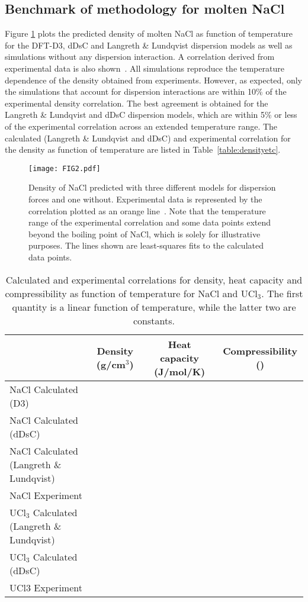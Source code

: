 \documentclass[preprint,3p,10pt,twocolumn,number,sort&compress]{elsarticle}
\begin{document}
\subsection{Benchmark of methodology for molten NaCl}
Figure \ref{fig:NaCldensity} plots the predicted density of molten NaCl as function of temperature for the DFT-D3, dDsC and Langreth \& Lundqvist dispersion models as well as simulations without any dispersion interaction. A correlation derived from experimental data is also shown~\cite{}. All simulations reproduce the temperature dependence of the density obtained from experiments. However, as expected, only the simulations that account for dispersion interactions are within 10\% of the experimental density correlation. The best agreement is obtained for the Langreth \& Lundqvist and dDsC dispersion models, which are within 5\% or less of the experimental correlation across an extended temperature range. The calculated (Langreth \& Lundqvist  and dDsC) and experimental correlation for the density as function of temperature are listed in Table~\ref{table:densityetc}.

\begin{figure}[htb]
\centering
\texttt{[image: FIG2.pdf]}
\caption{Density of NaCl predicted with three different models for dispersion forces and one without. Experimental data is represented by the correlation plotted as an orange line~\cite{}. Note that the temperature range of the experimental correlation and some data points extend beyond the boiling point of NaCl, which is solely for illustrative purposes. The lines shown are least-squares fits to the calculated data points.} 
\label{fig:NaCldensity}
\end{figure}

\begin{table*}[hb!]
\centering
\begin{tabular}{lccc}
\hline
\hline
& Density (g/cm$^3$)	&Heat capacity (J/mol/K) &Compressibility ()\\
\hline
NaCl Calculated (D3)	& & &\\
NaCl Calculated (dDsC)	& & &\\
NaCl Calculated (Langreth \& Lundqvist)	& & &\\
NaCl Experiment	& & &\\
UCl$_3$ Calculated (Langreth \& Lundqvist) & & & \\	
UCl$_3$ Calculated (dDsC) & & & \\	
UCl3 Experiment	& & & \\
\hline
\hline
\end{tabular}
\caption{Calculated and experimental correlations for density, heat capacity and compressibility as function of temperature for NaCl and UCl$_3$. The first quantity is a linear function of temperature, while the latter two are constants.}
\label{table:NaCldensityetc}
\end{table*}
 
\end{document}
